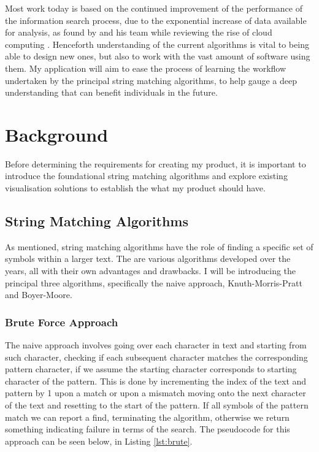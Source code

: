 \documentclass{l4proj}
\begin{document}
Most work today is based on the continued improvement of the performance of the information search process, due to the exponential increase of data available for analysis, as found by \cite{HASHEM201598} and his team while reviewing the rise of cloud computing . Henceforth understanding of the current algorithms is vital to being able to design new ones, but also to work with the vast amount of software using them. My application will aim to ease the process of learning the workflow undertaken by the principal string matching algorithms, to help gauge a deep understanding that can benefit individuals in the future.

\chapter{Background}
Before determining the requirements for creating my product, it is important to introduce the foundational string matching algorithms and explore existing visualisation solutions to establish the what my product should have.

\section{String Matching Algorithms}

As mentioned, string matching algorithms have the role of finding a specific set of symbols within a larger text. The are various algorithms developed over the years, all with their own advantages and drawbacks. I will be introducing the principal three algorithms, specifically the naive approach, Knuth-Morris-Pratt and Boyer-Moore.


\subsection{Brute Force Approach}
\label{alg:brute-force}
The naive approach involves going over each character in text and starting from such character, checking if each subsequent character matches the corresponding pattern character, if we assume the starting character corresponds to starting character of the pattern. This is done by incrementing the index of the text and pattern by 1 upon a match or upon a mismatch moving onto the next character of the text and resetting to the start of the pattern. If all symbols of the pattern match we can report a find, terminating the algorithm, otherwise we return something indicating failure in terms of the search. The pseudocode for this approach can be seen below, in Listing \ref{lst:brute}.
\end{document}
